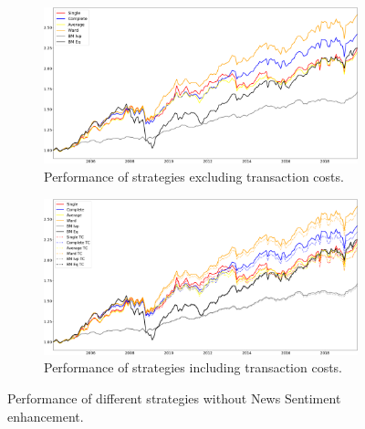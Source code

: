 \newpage
\begin{figure}[H] %
\centering

\begin{subfigure}{0.8\textwidth}%
\centering
\includegraphics[width=\linewidth]{Plots_and_Tables/perf_noTC_without_NS_F_1_B_0_LB_12_0.png}
\caption{Performance of strategies excluding transaction costs.} \label{fig:notc_noNS_perf}
\end{subfigure}%

\medskip
\begin{subfigure}{0.8\textwidth}%
\centering
\includegraphics[width=\linewidth]{Plots_and_Tables/perf_noTC_andTC_without_NS_F_1_B_0_LB_12_0.png}
\caption{Performance of strategies including transaction costs.} \label{fig:tc_noNS_perf}
\end{subfigure}%




\caption{Performance of different strategies without News Sentiment enhancement.} \label{fig:noNS_perf}
\end{figure}
\newpage